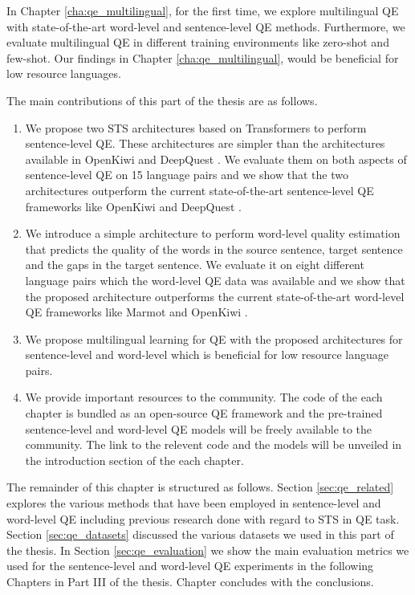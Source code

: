 In Chapter \ref{cha:qe_multilingual}, for the first time, we explore multilingual QE with state-of-the-art word-level and sentence-level QE methods. Furthermore, we evaluate multilingual QE in different training environments like zero-shot and few-shot. Our findings in Chapter \ref{cha:qe_multilingual}, would be beneficial for low resource languages. 


The main contributions of this part of the thesis are as follows.

\begin{enumerate}

	\item We propose two STS architectures based on Transformers to perform sentence-level QE. These architectures are simpler than the  architectures available in OpenKiwi \autocite{kepler-etal-2019-openkiwi} and DeepQuest \autocite{ive-etal-2018-deepquest}. We evaluate them on both aspects of sentence-level QE on 15 language pairs and we show that the two architectures outperform the current state-of-the-art sentence-level QE frameworks like OpenKiwi \autocite{kepler-etal-2019-openkiwi} and DeepQuest \autocite{ive-etal-2018-deepquest}.
	
	
	\item We introduce a simple architecture to perform word-level quality estimation that predicts the quality of the words in the source sentence, target sentence and the gaps in the target sentence. We evaluate it on eight different language pairs which the word-level QE data was available and we show that the proposed architecture outperforms the current state-of-the-art word-level QE frameworks like Marmot \autocite{logacheva-etal-2016-marmot} and OpenKiwi \autocite{kepler-etal-2019-openkiwi}.

	\item We propose multilingual learning for QE with the proposed architectures for sentence-level and word-level which is beneficial for low resource language pairs. 
	
	\item We provide important resources to the community. The code of the each chapter is bundled as an open-source QE framework and the pre-trained sentence-level and word-level QE models will be freely available to the community. The link to the relevent code and the models will be unveiled in the introduction section of the each chapter. 
\end{enumerate}

The remainder of this chapter is structured as follows. Section \ref{sec:qe_related} explores the various methods that have been employed in sentence-level and word-level QE including previous research done with regard to STS in QE task. Section \ref{sec:qe_datasets} discussed the various datasets we used in this part of the thesis. In Section \ref{sec:qe_evaluation} we show the main evaluation metrics we used for the sentence-level and word-level QE experiments in the following Chapters in Part III of the thesis.  Chapter concludes with the conclusions.



